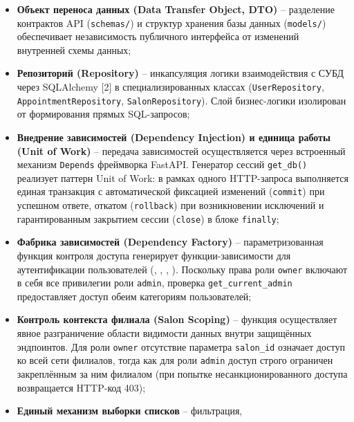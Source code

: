 \begin{itemize}
  \item \textbf{Объект переноса данных (Data Transfer Object, DTO)} --
        разделение контрактов API (\texttt{schemas/}) и структур хранения
        базы данных (\texttt{models/}) обеспечивает независимость
        публичного интерфейса от изменений внутренней схемы данных;
  \item \textbf{Репозиторий (Repository)} -- инкапсуляция логики
        взаимодействия с СУБД через SQLAlchemy [2] в специализированных
        классах (\texttt{UserRepository}, \texttt{AppointmentRepository},
        \texttt{SalonRepository}). Слой бизнес-логики изолирован от
        формирования прямых SQL-запросов;
  \item \textbf{Внедрение зависимостей (Dependency Injection) и единица
        работы (Unit of Work)} -- передача зависимостей осуществляется
        через встроенный механизм \texttt{Depends} фреймворка FastAPI.
        Генератор сессий \texttt{get\_db()} реализует паттерн Unit of
        Work: в рамках одного HTTP-запроса выполняется единая транзакция
        с автоматической фиксацией изменений (\texttt{commit}) при
        успешном ответе, откатом (\texttt{rollback}) при возникновении
        исключений и гарантированным закрытием сессии (\texttt{close}) в
        блоке \texttt{finally};
  \item \textbf{Фабрика зависимостей (Dependency Factory)} --
        параметризованная функция контроля доступа
         генерирует функции-зависимости для
        аутентификации пользователей (,
        , ,
        ). Поскольку права роли \texttt{owner}
        включают в себя все привилегии роли \texttt{admin}, проверка
        \texttt{get\_current\_admin} предоставляет доступ обеим категориям
        пользователей;
  \item \textbf{Контроль контекста филиала (Salon Scoping)} -- функция
        осуществляет явное разграничение области видимости данных внутри
        защищённых эндпоинтов. Для роли \texttt{owner} отсутствие
        параметра \texttt{salon\_id} означает доступ ко всей сети
        филиалов, тогда как для роли \texttt{admin} доступ строго
        ограничен закреплённым за ним филиалом (при попытке
        несанкционированного доступа возвращается HTTP-код 403);
  \item \textbf{Единый механизм выборки списков} -- фильтрация,

\end{itemize}
